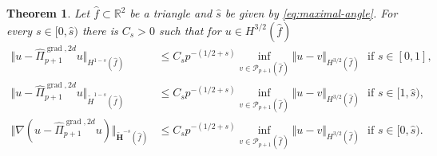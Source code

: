 \documentclass{article}
\newtheorem{theorem}{Theorem}[section]
\newcommand{\hatPigradcomtwod}{\widehat\Pi^{\operatorname*{grad},2d}_{p+1}}
\begin{document}
\begin{theorem}
\label{lemma:demkowicz-grad-2D} 
Let $\widehat f\subset{\mathbb R}^2$ be a triangle and 
$\widehat{s}$ be given by \eqref{eq:maximal-angle}.
For every $s\in [0,\widehat{s})$
there is $C_{s}>0$ such that
for $u\in H^{3/2}(\widehat{f})$
\begin{subequations}
\label{eq:lemma:demkowicz-grad-2D-10}%
\begin{align}
\label{eq:lemma:demkowicz-grad-2D-10-a}%
\Vert u-\hatPigradcomtwod u\Vert_{H^{1-s}(\widehat{f})}& \leq
C_{s}p^{-(1/2+s)}\!\!\!\inf_{v \in {\mathcal P}_{p+1}(\widehat f)} \Vert u -v \Vert_{H^{3/2}(\widehat{f})} 
\,\,\mbox{ if $s \in [0,1]$}, \\
\label{eq:lemma:demkowicz-grad-2D-10-b}%
\Vert u-\hatPigradcomtwod u\Vert_{\widetilde H^{1-s}(\widehat{f})}& \leq
C_{s}p^{-(1/2+s)}\!\!\!\inf_{v \in {\mathcal P}_{p+1}(\widehat f)} \Vert u -v \Vert_{H^{3/2}(\widehat{f})} 
\,\,\mbox{ if $s \in [1,\widehat{s})$}, \\
\label{eq:lemma:demkowicz-grad-2D-10-c}%
\Vert \nabla(u-\hatPigradcomtwod u)\Vert_{\widetilde{\mathbf{H}}^{-s}(\widehat{f})}& \leq
C_{s}p^{-(1/2+s)}\!\!\!\inf_{v \in {\mathcal P}_{p+1}(\widehat f)} \Vert u -v \Vert_{H^{3/2}(\widehat{f})} 
\,\,\mbox{ if $s \in [0,\widehat{s})$}.
\end{align}
\end{subequations}
\end{theorem}
\end{document}
